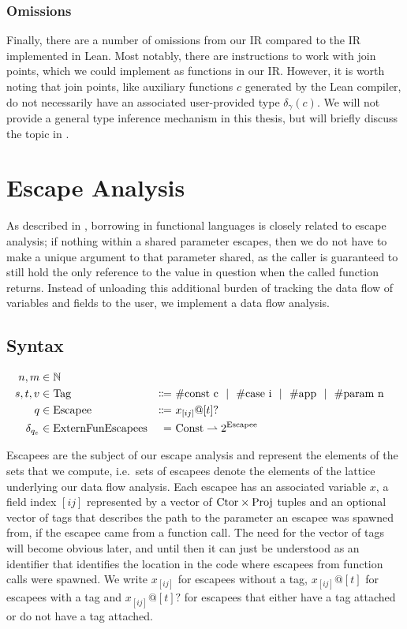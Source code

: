 \subsubsection{Omissions}
Finally, there are a number of omissions from our IR compared to the IR implemented in Lean. Most notably, there are instructions to work with join points, which we could implement as functions in our IR. However, it is worth noting that join points, like auxiliary functions $c$ generated by the Lean compiler, do not necessarily have an associated user-provided type $\delta_\gamma(c)$. We will not provide a general type inference mechanism in this thesis, but will briefly discuss the topic in .

\newcommand{\Tag}{\mathrm{Tag}}
\newcommand{\Escapee}{\mathrm{Escapee}}
\newcommand{\ExternFunEscapees}{\mathrm{ExternFunEscapees}}

\section{Escape Analysis}\label{sec:escapeanalysis}
As described in , borrowing in functional languages is closely related to escape analysis; if nothing within a shared parameter escapes, then we do not have to make a unique argument to that parameter shared, as the caller is guaranteed to still hold the only reference to the value in question when the called function returns. Instead of unloading this additional burden of tracking the data flow of variables and fields to the user, we implement a data flow analysis.

\subsection{Syntax}
\begin{alignat*}{3}
  n, m &\in \mathbb{N} \\
  s, t, v &\in \Tag &\Coloneqq&\ \#\textrm{const c} \sep \#\textrm{case i} \sep \#\textrm{app} \sep \#\textrm{param n} \\
  q &\in \Escapee\ &\Coloneqq&\ x_{[ij]} @ [t]? \\
  \delta_{q_e} &\in \ExternFunEscapees &=&\ \Const \rightharpoonup 2^{\Escapee}
\end{alignat*}

Escapees are the subject of our escape analysis and represent the elements of the sets that we compute, i.e.\ sets of escapees denote the elements of the lattice underlying our data flow analysis. Each escapee has an associated variable $x$, a field index $[ij]$ represented by a vector of $\mathrm{Ctor} \times \mathrm{Proj}$ tuples and an optional vector of tags that describes the path to the parameter an escapee was spawned from, if the escapee came from a function call. The need for the vector of tags will become obvious later, and until then it can just be understood as an identifier that identifies the location in the code where escapees from function calls were spawned. We write $x_{[ij]}$ for escapees without a tag, $x_{[ij]} @ [t]$ for escapees with a tag and $x_{[ij]} @ [t]?$ for escapees that either have a tag attached or do not have a tag attached.

